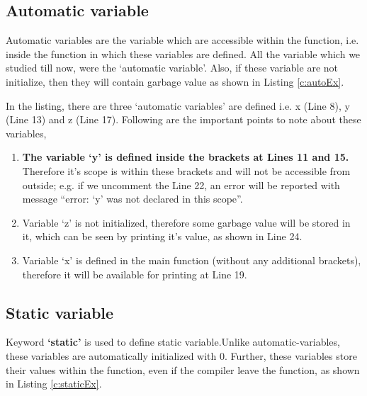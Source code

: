 \subsection{Automatic variable}
Automatic variables are the variable which are accessible within the function, i.e. inside the function in which these variables are defined. All the variable which we studied till now, were the `automatic variable'. Also, if these variable are not initialize, then they will contain garbage value as shown in Listing \ref{c:autoEx}. 
 
\begin{explanation}
	In the listing, there are three `automatic variables' are defined i.e. x (Line 8), y (Line 13) and z (Line 17). Following are the important points to note about these variables, 
	
	\begin{enumerate}
		\item \textbf{The variable `y' is defined inside the brackets at Lines 11 and 15.} Therefore it's scope is within these brackets and will not be accessible from outside; e.g. if we uncomment the Line 22, an error will be reported with message ``error: `y' was not declared in this scope''.
		
		\item Variable `z' is not initialized, therefore some garbage value will be stored in it, which can be seen by printing it's value, as shown in Line 24. 
		
		\item Variable `x' is defined in the main function (without any additional brackets), therefore it will be available for printing at Line 19.   
	\end{enumerate}
\end{explanation}



\subsection{Static variable}
Keyword \textbf{`static'} is used to define static variable.Unlike automatic-variables, these variables are automatically initialized with 0. Further, these variables store their values within the function, even if the compiler leave the function, as shown in Listing \ref{c:staticEx}. 

